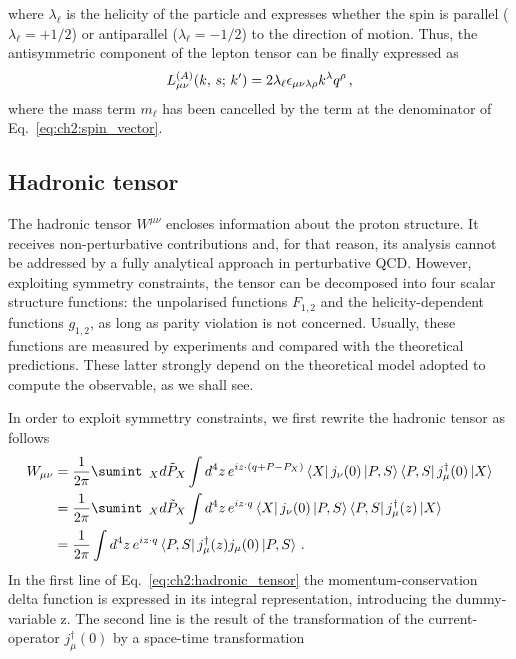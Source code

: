 where $\lambda_{\ell}$ is the helicity of the particle and expresses whether the spin is parallel ($\lambda_{\ell} = +1/2$) or antiparallel ($\lambda_{\ell} = -1/2$) to the direction of motion. Thus, the antisymmetric component of the lepton tensor can be finally expressed as
\begin{equation}
    L_{\mu \nu}^{(A)} \qty(k,\,s;\, k') = 2\lambda_{\ell} \epsilon_{\mu \nu \lambda \rho} k^{\lambda} q^{\rho} \,,
    \label{eq:lep_tens_anti}
\end{equation}
where the mass term $m_{\ell}$ has been cancelled by the term at the denominator of Eq.~\eqref{eq:ch2:spin_vector}.



\subsection*{Hadronic tensor}
The hadronic tensor $W^{\mu \nu}$ encloses information about the proton structure. It receives non-perturbative contributions and, for that reason, its analysis cannot be addressed by a fully analytical approach in perturbative QCD. However, exploiting symmetry constraints, the tensor can be decomposed into four scalar structure functions: the unpolarised functions $F_{1,2}$ and the helicity-dependent functions $g_{1,2}$, as long as parity violation is not concerned. Usually, these functions are measured by experiments and compared with the theoretical predictions. These latter strongly depend on the theoretical model adopted to compute the observable, as we shall see.\par
In order to exploit symmettry constraints, we first rewrite the hadronic tensor as follows
\begin{equation}
    \begin{split}
        W_{\mu\nu} &= \frac{1}{2\pi} \sumint_{\;\;X} \tilde{d P_X} \int d^4z \, e^{iz \cdot \qty(q + P - P_{X})}\bra{X} j_{\nu}(0) \ket{P,S} \bra{P,S} j^{\dag}_{\mu}(0) \ket{X}\\
        & = \frac{1}{2\pi} \sumint_{\;\;X} \tilde{d P_X} \int d^4z \, e^{iz \cdot q}\bra{X} j_{\nu}(0) \ket{P,S} \bra{P,S} j^{\dag}_{\mu}(z) \ket{X} \\
        & = \frac{1}{2\pi} \int d^4z \, e^{i z \cdot q} \bra{P,S} j^{\dag}_{\mu}(z) j_{\mu}(0) \ket{P,S} \,.
    \end{split}
    \label{eq:ch2:hadronic_tensor}
\end{equation}
In the first line of Eq.~\eqref{eq:ch2:hadronic_tensor} the momentum-conservation delta function is expressed in its integral representation, introducing the dummy-variable z. The second line is the result of the transformation of the current-operator $j^{\dag}_{\mu}(0)$ by a space-time transformation 
